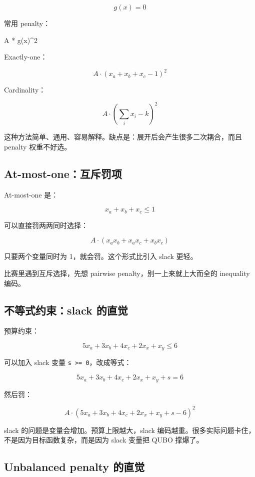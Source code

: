 \documentclass[UTF8,12pt,a4paper]{ctexart}
\begin{document}
\[
g(x) = 0
\]

常用 penalty：

\begin{GuideVerbatim}
A * g(x)^2
\end{GuideVerbatim}

Exactly-one：

\[
A \cdot  (x_{a} + x_{b} + x_{c} - 1)^2
\]

Cardinality：

\[
A \cdot  (\sum_{i} x_{i} - k)^2
\]

这种方法简单、通用、容易解释。缺点是：展开后会产生很多二次耦合，而且 penalty 权重不好选。

\subsection*{At-most-one：互斥罚项}

At-most-one 是：

\[
x_{a} + x_{b} + x_{c} \le 1
\]

可以直接罚两两同时选择：

\[
A \cdot  (x_{a} x_{b} + x_{a} x_{c} + x_{b} x_{c})
\]

只要两个变量同时为 1，就会罚。这个形式比引入 slack 更轻。

比赛里遇到互斥选择，先想 pairwise penalty，别一上来就上大而全的 inequality 编码。

\subsection*{不等式约束：slack 的直觉}

预算约束：

\[
5 x_{a} + 3 x_{b} + 4 x_{c} + 2 x_{x} + x_{y} \le 6
\]

可以加入 slack 变量 \texttt{s >= 0}，改成等式：

\[
5 x_{a} + 3 x_{b} + 4 x_{c} + 2 x_{x} + x_{y} + s = 6
\]

然后罚：

\[
A \cdot  (5 x_{a} + 3 x_{b} + 4 x_{c} + 2 x_{x} + x_{y} + s - 6)^2
\]

slack 的问题是变量会增加。预算上限越大，slack 编码越重。很多实际问题卡住，不是因为目标函数复杂，而是因为 slack 变量把 QUBO 撑爆了。

\subsection*{Unbalanced penalty 的直觉}
\end{document}
